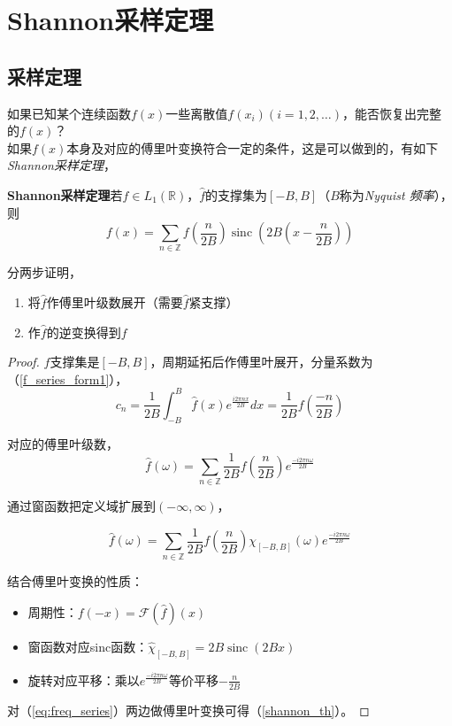 \section{Shannon采样定理}

\subsection{采样定理}

如果已知某个连续函数$f(x)$一些离散值$f(x_i)(i=1,2,\dots)$，能否恢复出完整的$f(x)$？\\

如果$f(x)$本身及对应的傅里叶变换符合一定的条件，这是可以做到的，有如下\textit{Shannon采样定理}，

\begin{theorem}\label{th:discret_rep}
	\textbf{Shannon采样定理}\quad 若$f \in L_{1}(\mathbb{R})$，$\hat{f}$的支撑集为$[-B,B]$（$B$称为\textit{Nyquist 频率}），则
	\begin{equation}\label{shannon_th}
		f(x) = \sum_{n \in \mathbb{Z}} f\left(\frac{n}{2B}\right) \mathop{sinc}\left(2B\left(x-\frac{n}{2B}\right)\right)
	\end{equation}
\end{theorem}

分两步证明，

\begin{enumerate}
	\item 将$\hat{f}$作傅里叶级数展开（需要$\hat{f}$紧支撑）
	\item 作$\hat{f}$的逆变换得到$f$
\end{enumerate}

\begin{proof}
	$\hat{f}$支撑集是$[-B,B]$，周期延拓后作傅里叶展开，分量系数为（\ref{f_series_form1}），
	\[
		c_n = \frac{1}{2B} \int_{-B}^B \hat{f}(x) e^{\frac{i2\pi  n x}{2B}}dx = \frac{1}{2B}f\left(\frac{-n}{2B}\right)
	\]
	
	对应的傅里叶级数，
	\begin{equation*}
		\hat{f}(\omega) = \sum_{n \in \mathbb{Z}}\frac{1}{2B}f\left(\frac{n}{2B}\right)e^{\frac{-i2\pi  n \omega}{2B}}
	\end{equation*}

	通过窗函数把定义域扩展到$(-\infty,\infty)$，
	
	\begin{equation}\label{eq:freq_series}
		\hat{f}(\omega) = \sum_{n \in \mathbb{Z}}\frac{1}{2B}f\left(\frac{n}{2B}\right)
		\chi_{[-B,B]}(\omega)
		e^{\frac{-i2\pi  n \omega}{2B}}
	\end{equation}

	结合傅里叶变换的性质：
	\begin{itemize}
		\item 周期性：$f(-x) = \mathcal{F}(\hat{f})(x)$
		\item 窗函数对应sinc函数：$\hat{\chi}_{[-B,B]}= 2B\mathop{sinc}(2Bx)$
		\item 旋转对应平移：乘以$e^{\frac{-i2\pi  n \omega}{2B}}$等价平移$-\frac{n}{2B}$
	\end{itemize}

	对（\ref{eq:freq_series}）两边做傅里叶变换可得（\ref{shannon_th}）。
\end{proof}

